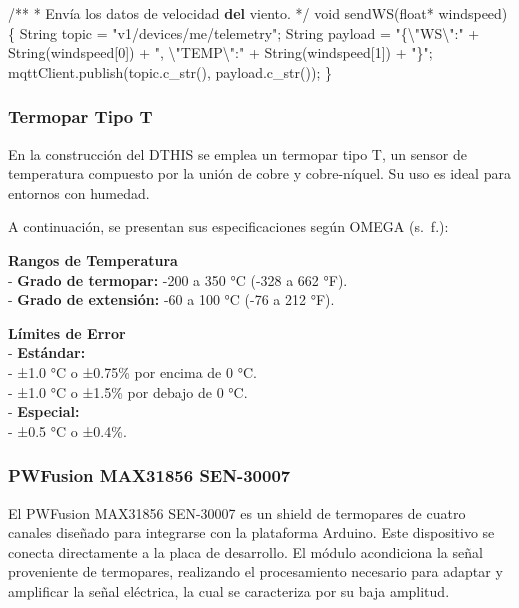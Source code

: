 \documentclass[
  letterpaper,
]{scrbook}
\newenvironment{Shaded}{\begin{snugshade}}{\end{snugshade}}
\newcommand{\BuiltInTok}[1]{\textcolor[rgb]{0.00,0.23,0.31}{#1}}
\newcommand{\CharTok}[1]{\textcolor[rgb]{0.13,0.47,0.30}{#1}}
\newcommand{\DecValTok}[1]{\textcolor[rgb]{0.68,0.00,0.00}{#1}}
\newcommand{\KeywordTok}[1]{\textcolor[rgb]{0.00,0.23,0.31}{\textbf{#1}}}
\newcommand{\NormalTok}[1]{\textcolor[rgb]{0.00,0.23,0.31}{#1}}
\newcommand{\OperatorTok}[1]{\textcolor[rgb]{0.37,0.37,0.37}{#1}}
\newcommand{\StringTok}[1]{\textcolor[rgb]{0.13,0.47,0.30}{#1}}
\begin{document}
\begin{Shaded}
\begin{Highlighting}[]
\OperatorTok{/**}
 \OperatorTok{*}\NormalTok{ Envía los datos de velocidad }\KeywordTok{del}\NormalTok{ viento.}
 \OperatorTok{*/}
\NormalTok{void sendWS(}\BuiltInTok{float}\OperatorTok{*}\NormalTok{ windspeed) \{}
\NormalTok{  String topic }\OperatorTok{=} \StringTok{"v1/devices/me/telemetry"}\OperatorTok{;}
\NormalTok{  String payload }\OperatorTok{=} \StringTok{"\{}\CharTok{\textbackslash{}"}\StringTok{WS}\CharTok{\textbackslash{}"}\StringTok{:"} \OperatorTok{+}\NormalTok{ String(windspeed[}\DecValTok{0}\NormalTok{]) }\OperatorTok{+} 
                   \StringTok{", }\CharTok{\textbackslash{}"}\StringTok{TEMP}\CharTok{\textbackslash{}"}\StringTok{:"} \OperatorTok{+}\NormalTok{ String(windspeed[}\DecValTok{1}\NormalTok{]) }\OperatorTok{+} \StringTok{"\}"}\OperatorTok{;}
\NormalTok{  mqttClient.publish(topic.c\_str(), payload.c\_str())}\OperatorTok{;}
\NormalTok{\}}
\end{Highlighting}
\end{Shaded}

\subsubsection{Termopar Tipo T}\label{termopar-tipo-t}

En la construcción del DTHIS se emplea un termopar tipo T, un sensor de
temperatura compuesto por la unión de cobre y cobre-níquel. Su uso es
ideal para entornos con humedad.

A continuación, se presentan sus especificaciones según OMEGA (s.~f.):

\textbf{Rangos de Temperatura}\\
- \textbf{Grado de termopar:} -200 a 350 °C (-328 a 662 °F).\\
- \textbf{Grado de extensión:} -60 a 100 °C (-76 a 212 °F).

\textbf{Límites de Error}\\
- \textbf{Estándar:}\\
- ±1.0 °C o ±0.75\% por encima de 0 °C.\\
- ±1.0 °C o ±1.5\% por debajo de 0 °C.\\
- \textbf{Especial:}\\
- ±0.5 °C o ±0.4\%.

\subsubsection{PWFusion MAX31856
SEN-30007}\label{pwfusion-max31856-sen-30007}

El PWFusion MAX31856 SEN-30007 es un shield de termopares de cuatro
canales diseñado para integrarse con la plataforma Arduino. Este
dispositivo se conecta directamente a la placa de desarrollo. El módulo
acondiciona la señal proveniente de termopares, realizando el
procesamiento necesario para adaptar y amplificar la señal eléctrica, la
cual se caracteriza por su baja amplitud.
\end{document}
